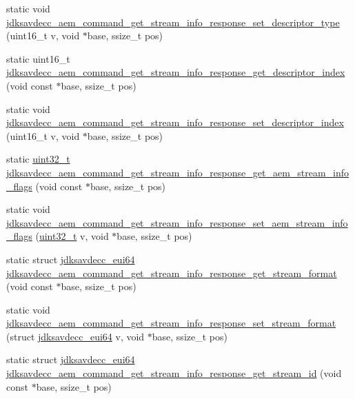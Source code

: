 \begin{DoxyCompactItemize}
static void \hyperlink{group__command__get__stream__info__response_ga9c677221e150e2b371c086c33c204cbb}{jdksavdecc\+\_\+aem\+\_\+command\+\_\+get\+\_\+stream\+\_\+info\+\_\+response\+\_\+set\+\_\+descriptor\+\_\+type} (uint16\+\_\+t v, void $\ast$base, ssize\+\_\+t pos)
\item 
static uint16\+\_\+t \hyperlink{group__command__get__stream__info__response_ga58de15f7ac5f1bca0d0a586e6c0a35ba}{jdksavdecc\+\_\+aem\+\_\+command\+\_\+get\+\_\+stream\+\_\+info\+\_\+response\+\_\+get\+\_\+descriptor\+\_\+index} (void const $\ast$base, ssize\+\_\+t pos)
\item 
static void \hyperlink{group__command__get__stream__info__response_gaba36240babe27f304c23f512f1f5beae}{jdksavdecc\+\_\+aem\+\_\+command\+\_\+get\+\_\+stream\+\_\+info\+\_\+response\+\_\+set\+\_\+descriptor\+\_\+index} (uint16\+\_\+t v, void $\ast$base, ssize\+\_\+t pos)
\item 
static \hyperlink{parse_8c_a6eb1e68cc391dd753bc8ce896dbb8315}{uint32\+\_\+t} \hyperlink{group__command__get__stream__info__response_gaf959298de474d121f4c6b2e89e6c1a34}{jdksavdecc\+\_\+aem\+\_\+command\+\_\+get\+\_\+stream\+\_\+info\+\_\+response\+\_\+get\+\_\+aem\+\_\+stream\+\_\+info\+\_\+flags} (void const $\ast$base, ssize\+\_\+t pos)
\item 
static void \hyperlink{group__command__get__stream__info__response_gadaa336cd606947b0757c0f6a88ff192b}{jdksavdecc\+\_\+aem\+\_\+command\+\_\+get\+\_\+stream\+\_\+info\+\_\+response\+\_\+set\+\_\+aem\+\_\+stream\+\_\+info\+\_\+flags} (\hyperlink{parse_8c_a6eb1e68cc391dd753bc8ce896dbb8315}{uint32\+\_\+t} v, void $\ast$base, ssize\+\_\+t pos)
\item 
static struct \hyperlink{structjdksavdecc__eui64}{jdksavdecc\+\_\+eui64} \hyperlink{group__command__get__stream__info__response_ga7d41b7db4a004ba095081d4d2360a248}{jdksavdecc\+\_\+aem\+\_\+command\+\_\+get\+\_\+stream\+\_\+info\+\_\+response\+\_\+get\+\_\+stream\+\_\+format} (void const $\ast$base, ssize\+\_\+t pos)
\item 
static void \hyperlink{group__command__get__stream__info__response_gafaa9294ecbd6f3e27d47016cc1aa3ebe}{jdksavdecc\+\_\+aem\+\_\+command\+\_\+get\+\_\+stream\+\_\+info\+\_\+response\+\_\+set\+\_\+stream\+\_\+format} (struct \hyperlink{structjdksavdecc__eui64}{jdksavdecc\+\_\+eui64} v, void $\ast$base, ssize\+\_\+t pos)
\item 
static struct \hyperlink{structjdksavdecc__eui64}{jdksavdecc\+\_\+eui64} \hyperlink{group__command__get__stream__info__response_ga4f291b37baae43a9121c4a9cd97ce4ca}{jdksavdecc\+\_\+aem\+\_\+command\+\_\+get\+\_\+stream\+\_\+info\+\_\+response\+\_\+get\+\_\+stream\+\_\+id} (void const $\ast$base, ssize\+\_\+t pos)

\end{DoxyCompactItemize}
